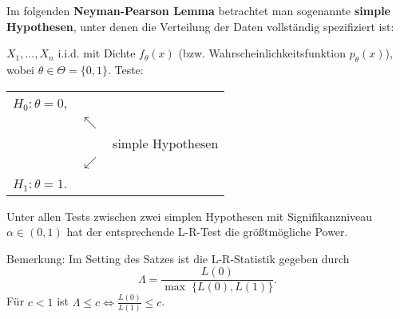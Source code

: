 \documentclass{tstextbook}
\begin{document}
Im folgenden \textbf{Neyman-Pearson Lemma} betrachtet man sogenannte \textbf{simple Hypothesen}, unter denen die Verteilung der Daten vollständig spezifiziert ist:

$ X_1,\ldots,X_n $ i.i.d. mit Dichte $ f_\theta(x) $ (bzw. Wahrscheinlichkeitsfunktion $ p_\theta(x) $), wobei $ \theta\in\Theta=\{0,1\} $. Teste:

	\begin{center}
	\begin{tabular}{lll}
		$ H_0\colon\theta=0 $, & & \\
		& $ \nwarrow $ & \\
		&& simple Hypothesen \\
		& $ \swarrow $ & \\
		$ H_1\colon\theta=1 $.
	\end{tabular}
	\end{center}

\begin{satz}
	Unter allen Tests zwischen zwei simplen Hypothesen mit Signifikanzniveau $ \alpha\in(0,1) $ hat der entsprechende L-R-Test die größtmögliche Power.
\end{satz}

\begin{remark}
	Bemerkung:  Im Setting des Satzes ist die L-R-Statistik gegeben durch 
	\[
	\Lambda = \frac{L(0)}{\max\;\{L(0),L(1)\}}.
	\]
	Für $ c<1 $ ist $ \Lambda\le c \Leftrightarrow \frac{L(0)}{L(1)} \le c $.
\end{remark}
\end{document}
